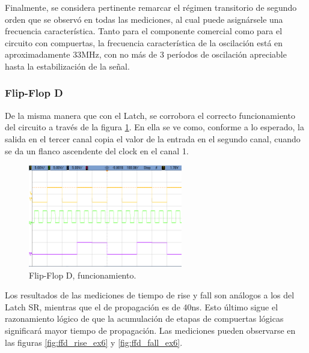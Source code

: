 Finalmente, se considera pertinente remarcar el régimen transitorio de segundo orden que se observó en todas las mediciones, al cual puede asignársele una 
frecuencia característica.
Tanto para el componente comercial como para el circuito con compuertas, la frecuencia característica de la oscilación está en aproximadamente 33MHz, con no más de 3 
períodos de oscilación apreciable hasta la estabilización de la señal.


\subsubsection{Flip-Flop D}
De la misma manera que con el Latch, se corrobora el correcto funcionamiento del circuito a través de la figura \ref{fig:ffd_ex6}.
En ella se ve como, conforme a lo esperado, la salida en el tercer canal copia el valor de la entrada en el segundo canal, cuando se da un flanco ascendente del clock en 
el canal 1.

\begin{figure}[H]
    \centering
    \includegraphics[width=0.6\textwidth]{../EJ6/Recursos/ffd_hold_and_set_up}
    \caption{Flip-Flop D, funcionamiento.}
    \label{fig:ffd_ex6}
\end{figure}

Los resultados de las mediciones de tiempo de rise y fall son análogos a los del Latch SR, mientras que el de propagación es de 40ns.
Esto último sigue el razonamiento lógico de que la acumulación de etapas de compuertas lógicas significará mayor tiempo de propagación.
Las mediciones pueden observarse en las figuras \ref{fig:ffd_rise_ex6} y \ref{fig:ffd_fall_ex6}.

